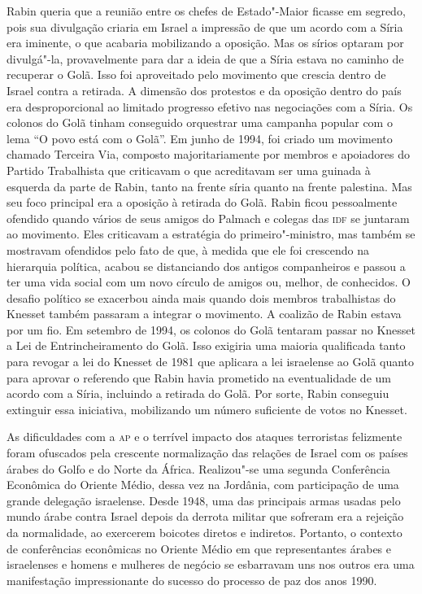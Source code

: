 Rabin queria que a reunião entre os chefes de Estado"-Maior ficasse em
segredo, pois sua divulgação criaria em Israel a impressão de que um
acordo com a Síria era iminente, o que acabaria mobilizando a oposição.
Mas os sírios optaram por divulgá"-la, provavelmente para dar a ideia de
que a Síria estava no caminho de recuperar o Golã. Isso foi aproveitado
pelo movimento que crescia dentro de Israel contra a retirada. A
dimensão dos protestos e da oposição dentro do país era desproporcional
ao limitado progresso efetivo nas negociações com a Síria. Os colonos do
Golã tinham conseguido orquestrar uma campanha popular com o lema ``O
povo está com o Golã''. Em junho de 1994, foi criado um movimento
chamado Terceira Via, composto majoritariamente por membros e apoiadores
do Partido Trabalhista que criticavam o que acreditavam ser uma guinada
à esquerda da parte de Rabin, tanto na frente síria quanto na frente
palestina. Mas seu foco principal era a oposição à retirada do Golã.
Rabin ficou pessoalmente ofendido quando vários de seus amigos do
Palmach e colegas das \textsc{idf} se juntaram ao movimento. Eles criticavam a
estratégia do primeiro"-ministro, mas também se mostravam ofendidos pelo
fato de que, à medida que ele foi crescendo na hierarquia política, acabou se
distanciando dos antigos companheiros e passou a ter uma vida social com
um novo círculo de amigos ou, melhor, de conhecidos. O desafio político
se exacerbou ainda mais quando dois membros trabalhistas do Knesset
também passaram a integrar o movimento. A coalizão de Rabin estava por
um fio. Em setembro de 1994, os colonos do Golã tentaram passar no
Knesset a Lei de Entrincheiramento do Golã. Isso exigiria uma maioria
qualificada tanto para revogar a lei do Knesset de 1981 que aplicara a
lei israelense ao Golã quanto para aprovar o referendo que Rabin havia
prometido na eventualidade de um acordo com a Síria, incluindo a
retirada do Golã. Por sorte, Rabin conseguiu extinguir essa iniciativa,
mobilizando um número suficiente de votos no Knesset.

As dificuldades com a \textsc{ap} e o terrível impacto dos ataques terroristas
felizmente foram ofuscados pela crescente normalização das relações de
Israel com os países árabes do Golfo e do Norte da África. Realizou"-se
uma segunda Conferência Econômica do Oriente Médio, dessa vez na
Jordânia, com participação de uma grande delegação israelense. Desde
1948, uma das principais armas usadas pelo mundo árabe contra Israel
depois da derrota militar que sofreram era a rejeição da normalidade, ao
exercerem boicotes diretos e indiretos. Portanto, o contexto de
conferências econômicas no Oriente Médio em que representantes árabes e
israelenses e homens e mulheres de negócio se esbarravam uns nos outros
era uma manifestação impressionante do sucesso do processo de paz dos
anos 1990.

